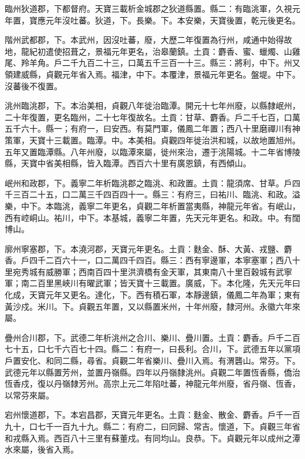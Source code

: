 \begin{pinyinscope}
 臨州狄道郡，下都督府。天寶三載析金城郡之狄道縣置。縣二：有臨洮軍，久視元年置，寶應元年沒吐蕃。狄道，下。長樂。下。本安樂，天寶後置，乾元後更名。



 階州武都郡，下。本武州，因沒吐蕃，廢，大歷二年復置為行州，咸通中始得故地，龍紀初遣使招葺之，景福元年更名，治皋蘭鎮。土貢：麝香、蜜、蠟燭、山雞尾、羚羊角。戶二千九百二十三，口萬五千三百一十三。縣三：將利，中下。州又領建威縣，貞觀元年省入焉。福津，中下。本覆津，景福元年更名。盤堤。中下。沒蕃後不復置。



 洮州臨洮郡，下。本治美相，貞觀八年徙治臨潭。開元十七年州廢，以縣隸岷州，二十年復置，更名臨州，二十七年復故名。土貢：甘草、麝香。戶二千七百，口萬五千六十。縣一；有府一，曰安西。有莫門軍，儀鳳二年置；西八十里磨禪川有神策軍，天寶十三載置。臨潭。中。本美相。貞觀四年徙治洪和城，以故地置旭州。五年又置臨潭縣。八年州廢，以臨潭來屬，徙州來治，遷于洮陽城。十二年省博陵縣，天寶中省美相縣，皆入臨潭。西百六十里有廣恩鎮，有西傾山。



 岷州和政郡，下。義寧二年析臨洮郡之臨洮、和政置。土貢：龍須席、甘草。戶四千三百二十五，口二萬三千四百四十一。縣三：有府三，曰祐川、臨洮、和政。溢樂，中下。本臨洮，義寧二年更名，貞觀二年析置當夷縣，神龍元年省。有岷山，西有崆峒山。祐川，中下。本基城，義寧二年置，先天元年更名。和政。中。有闊博山。



 廓州寧塞郡，下。本澆河郡，天寶元年更名。土貢：麩金、酥、大黃、戎鹽、麝香。戶四千二百六十一，口二萬四千四百。縣三：西有寧邊軍，本寧塞軍；西八十里宛秀城有威勝軍；西南百四十里洪濟橋有金天軍，其東南八十里百穀城有武寧軍；南二百里黑峽川有曜武軍；皆天寶十三載置。廣威，下。本化隆，先天元年曰化成，天寶元年又更名。達化，下。西有積石軍，本靜邊鎮，儀鳳二年為軍；東有黃沙戍。米川。下。貞觀五年置，又以縣置米州，十年州廢，隸河州。永徽六年來屬。



 疊州合川郡，下。武德二年析洮州之合川、樂川、疊川置。土貢：麝香。戶千二百七十五，口七千六百七十四。縣二：有府一，曰長利。合川，下。武德五年以黨項戶置安化、和同二縣，尋省。貞觀二年省樂川、疊川入焉。有渭礱山。常芬。下。武德元年以縣置芳州，並置丹嶺縣。四年以丹嶺隸洮州。貞觀二年置恆香縣，僑治恆香戍，復以丹嶺隸芳州。高宗上元二年陷吐蕃，神龍元年州廢，省丹嶺、恆香，以常芬來屬。



 宕州懷道郡，下。本宕昌郡，天寶元年更名。土貢：麩金、散金、麝香。戶千一百九十，口七千一百九十九。縣二：有府二，曰同歸、常吉。懷道，下。貞觀三年省和戎縣入焉。西百八十三里有蘇董戍。有同均山。良恭。下。貞觀元年以成州之潭水來屬，後省入焉。




\end{pinyinscope}

